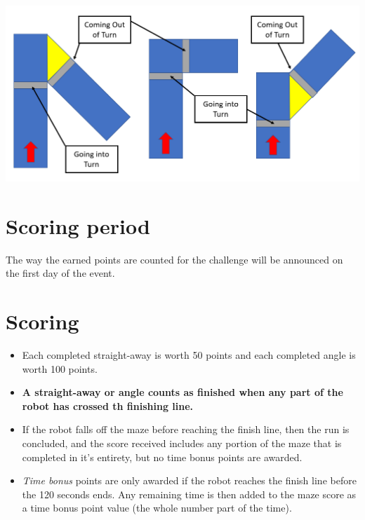 \documentclass[a4paper,12pt]{article}
\begin{document}
\begin{itemize}
\includegraphics[width=1.0\textwidth]{amazeing_angle.png}
\end{itemize}

\section{Scoring period}
\par The way the earned points are counted for the challenge will be announced on the first day of the event.

\section{Scoring}
\begin{itemize}
\item Each completed straight-away is worth 50 points and each completed angle is worth 100 points.
\item \textbf{A straight-away or angle counts as finished when any part of the robot has crossed th finishing line.}
\item If the robot falls off the maze before reaching the finish line, then the run is concluded, and the score received
includes any portion of the maze that is completed in it’s entirety, but no time bonus points are awarded.
\item \emph{Time bonus} points are only awarded if the robot reaches the finish line before the 120 seconds ends. Any
remaining time is then added to the maze score as a time bonus point value (the whole number part of the
time).
\end{itemize}
\end{document}
